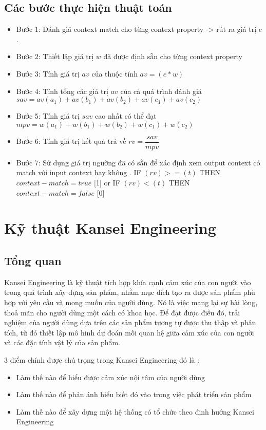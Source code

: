 \subsection{Các bước thực hiện thuật toán }	
 \begin{itemize}
\item Bước 1: Đánh giá context match cho từng context property -> rút ra giá trị $e$ . 
\item Bước 2: Thiết lập giá trị $w$ đã được định sẵn cho từng context property
\item Bước 3: Tính giá trị $av$ của thuộc tính $av = (e* w)$
\item Bước 4: Tính tổng các giá trị $av$ của cả quá trình đánh giá $sav = av(a_1) + av(b_1) + av(b_2) + av(c_1) + av(c_2)$
\item Bước 5: Tính giá trị $sav$ cao nhất có thể đạt $mpv = w(a_1) + w(b_1) +w(b_2) + w(c_1) + w(c_2)$
\item Bước 6: Tính giá trị kết quả trả về $rv = \dfrac{sav}{mpv}$
\item Bước 7: Sử dụng giá trị ngưỡng đã có sẵn để xác định xem output context có match với input context hay không . IF $(rv) >= (t)$ THEN $context-match = true$ [1] or IF $(rv) < (t)$ THEN $context-match = false$ [0]
 \end{itemize}
\section{Kỹ thuật Kansei Engineering}

\subsection{Tổng quan}

Kansei Engineering là kỹ thuật tích hợp khía cạnh cảm xúc của con người vào trong quá trình xây dựng sản phẩm, nhằm mục đích tạo ra được sản phẩm phù hợp với yêu cầu và mong muốn của người dùng. Nó là việc mang lại sự hài lòng, thoả mãn cho người dùng một cách có khoa học. Để đạt được điều đó, trải nghiệm của người dùng dựa trên các sản phẩm tương tự được thu thập và phân tích, từ đó thiết lập mô hình dự đoán mối quan hệ giữa cảm xúc của con người và các đặc tính vật lý của sản phẩm.

3 điểm chính được chú trọng trong Kansei Engineering đó là :
\begin{itemize}
	\item Làm thế nào để hiểu được cảm xúc nội tâm của người dùng
	\item Làm thế nào để phản ánh hiểu biết đó vào trong việc phát triển sản phẩm
	\item Làm thế nào để xây dựng một hệ thống có tổ chức theo định hướng Kansei Engineering
\end{itemize}


